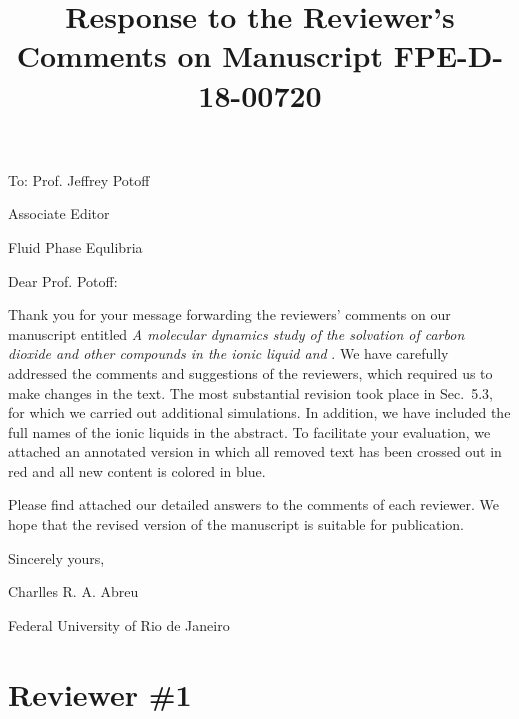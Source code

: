 \documentclass[]{article}
\title{\normalsize \textbf{Response to the Reviewer’s Comments on Manuscript FPE-D-18-00720}}
\author{}
\date{}
\begin{document}
\doublespacing
\maketitle

To: Prof. Jeffrey Potoff

Associate Editor

Fluid Phase Equlibria
\vspace{1cm}

Dear Prof. Potoff:

Thank you for your message forwarding the reviewers’ comments on our manuscript entitled \textit{A molecular dynamics study of the solvation of carbon dioxide and other compounds in the ionic liquid \ce{[emim][B(CN)_4]} and \ce{[emim][NTf_2]}}.
We have carefully addressed the comments and suggestions of the reviewers, which required us to make changes in the text.
The most substantial revision took place in Sec.~5.3, for which we carried out additional simulations.
In addition, we have included the full names of the ionic liquids in the abstract.
To facilitate your evaluation, we attached an annotated version in which all removed text has been crossed out in red and all new content is colored in blue.

Please find attached our detailed answers to the comments of each reviewer.
We
hope that the revised version of the manuscript is suitable for publication.

\begin{center}
Sincerely yours,
\end{center}
\begin{flushright}
Charlles R. A. Abreu

Federal University of Rio de Janeiro
\end{flushright}

\section{\textbf{Reviewer \#1}}
{}
\end{document}
